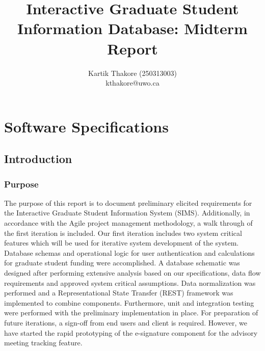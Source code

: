 \documentclass[11pt,a4paper]{report}
\begin{document}
\title{Interactive Graduate Student Information Database: Midterm Report} 
\author{Kartik Thakore (250313003)\\kthakore@uwo.ca}
\maketitle

\tableofcontents
\clearpage
\newpage
\chapter{Software Specifications}
\section{Introduction}
\subsection{Purpose}
The purpose of this report is to document preliminary elicited requirements for the Interactive Graduate Student Information System (SIMS). Additionally, in accordance with the Agile project management
methodology, a walk through of the first iteration is included. Our first iteration includes two system
critical features which will be used for iterative system development of the system. Database schemas and
operational logic for user authentication and calculations for graduate student funding were accomplished.
A database schematic was designed after performing extensive analysis based on our specifications, data flow
requirements and approved system critical assumptions. Data normalization was performed and a Representational State Transfer (REST) framework was implemented to combine components. Furthermore, unit and
integration testing were performed with the preliminary implementation in place. For preparation of future
iterations, a sign-off from end users and client is required. However, we have started the rapid prototyping
of the e-signature component for the advisory meeting tracking feature.
\end{document}
